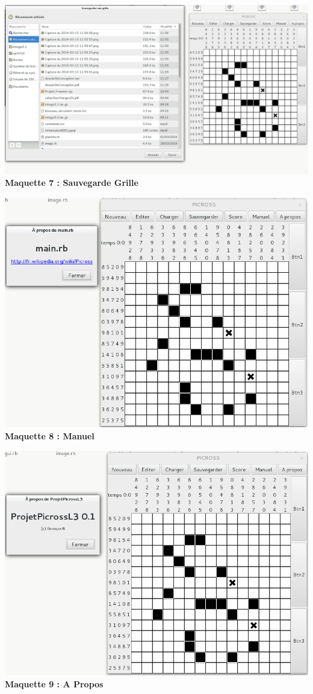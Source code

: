 \begin{center}
                \includegraphics[scale=0.6]{data/screenMaquette/SauvegardeGrille.png}\\
                \textbf{Maquette 7 : Sauvegarde Grille}
\end{center}


\begin{center}
                \includegraphics[scale=0.6]{data/screenMaquette/Manuel.png}\\
                \textbf{Maquette 8 : Manuel}
\end{center}

\begin{center}
                \includegraphics[scale=0.6]{data/screenMaquette/APropos.png}\\
                \textbf{Maquette 9 : A Propos}
\end{center}




